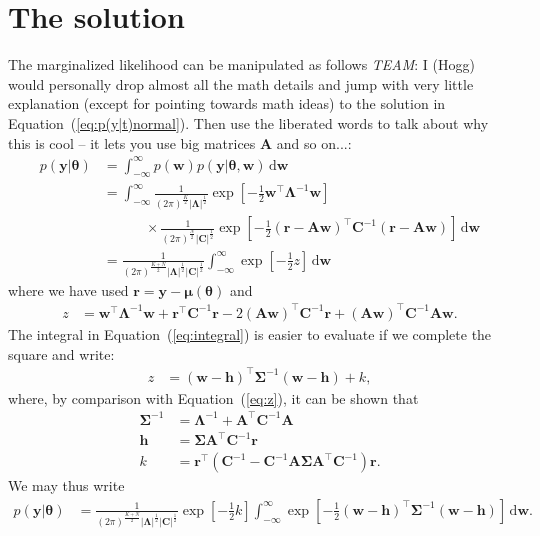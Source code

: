 \documentclass[modern]{rnaastex}
\renewcommand{\eqref}[1]{\ref{eq:#1}}
\newcommand{\Eq}[1]{Equation~(\eqref{#1})}
\newcommand{\eq}[1]{\Eq{#1}}
\newcommand{\eqlabel}[1]{\label{eq:#1}}
\newcommand{\todo}[3]{{\color{#2}\emph{#1}: #3}}
\newcommand{\alltodo}[1]{\todo{TEAM}{red}{#1}}
\newcommand{\dd}{\ensuremath{\,\mathrm{d}}}
\newcommand{\bvec}[1]{{\ensuremath{\boldsymbol{#1}}}}
\newcommand{\Gaussian}[3]{\ensuremath{\frac{1}{(2\pi)^\frac{#3}{2}|#2|^\frac{1}{2}}
            \exp\left[ -\frac{1}{2}#1^\top #2^{-1} #1 \right]}}
\newcommand{\mA}{\ensuremath{\bvec{A}}}
\newcommand{\mC}{\ensuremath{\bvec{C}}}
\newcommand{\mS}{\ensuremath{\bvec{\Sigma}}}
\newcommand{\mL}{\ensuremath{\bvec{\Lambda}}}
\newcommand{\vw}{\ensuremath{\bvec{w}}}
\newcommand{\vy}{\ensuremath{\bvec{y}}}
\newcommand{\vt}{\ensuremath{\bvec{\theta}}}
\newcommand{\vm}{\ensuremath{\bvec{\mu}(\bvec{\theta})}}
\newcommand{\vre}{\ensuremath{\bvec{r}}}
\newcommand{\vh}{\ensuremath{\bvec{h}}}
\begin{document}
\section{The solution}

The marginalized likelihood can be manipulated as follows \alltodo{I (Hogg) would personally drop almost all the math details and jump with very little explanation (except for pointing towards math ideas) to the solution in \eq{p(y|t)normal}. Then use the liberated words to talk about why this is cool -- it lets you use big matrices $\mA$ and so on...}:
\begin{align}
\eqlabel{integral}
p(\vy | \vt) &= \int_{-\infty}^{\infty} p(\vw) p(\vy | \vt, \vw) \dd\vw \nonumber \\
%
             &= \int_{-\infty}^{\infty} \Gaussian{\vw}{\mL}{K} \nonumber\\
             & \quad\quad\quad \times \Gaussian{(\vre - \mA \vw)}{\mC}{N}
               \dd\vw \nonumber \\
%
             &= \frac{1}{(2 \pi)^\frac{K + N}{2} |\mL|^\frac{1}{2} |\mC|^\frac{1}{2}}
                \int_{-\infty}^{\infty} \exp \left[ -\frac{1}{2} z \right] \dd\vw
\end{align}
%
where we have used $\vre = \vy - \vm$ and
%
\begin{align}
\eqlabel{z}
z &= \vw^\top \mL^{-1} \vw + \vre^\top \mC^{-1} \vre -
     2(\mA \vw)^\top \mC^{-1} \vre + (\mA \vw)^\top \mC^{-1} \mA \vw.
\end{align}
%
The integral in \eq{integral} is easier to evaluate if we
complete the square and write:
%
\begin{align}
\eqlabel{z_square}
z &= (\vw - \vh)^\top \mS^{-1} (\vw - \vh) + k,
\end{align}
%
where, by comparison with \eq{z}, it can be shown that
%
\begin{align}
\mS^{-1} &= \mL^{-1} + \mA^\top \mC^{-1} \mA \\
%
\vh &= \bvec{\Sigma}\mA^\top \mC^{-1} \vre \\
%
k &= \vre^\top \left( \mC^{-1} - \mC^{-1} \mA \mS \mA^\top \mC^{-1} \right) \vre.
\end{align}
%
We may thus write
%
\begin{align}
\eqlabel{p(y|t)ugly}
p(\vy | \vt) &= \frac{1}{(2 \pi)^\frac{K + N}{2}
                |\mL|^\frac{1}{2}
                |\mC|^\frac{1}{2}}
                \exp \left[ -\frac{1}{2}k \right]
                \int_{-\infty}^{\infty} \exp
                \left[-\frac{1}{2}(\vw - \vh)^\top \mS^{-1} (\vw - \vh)
                \right] \dd\vw.
\end{align}
\end{document}
